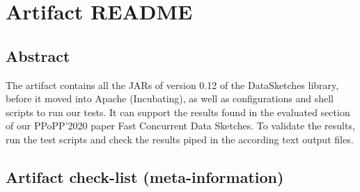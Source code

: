 \documentclass[onecolumn]{sigplanconf}
\begin{document}


\section{Artifact README}

\subsection{Abstract}



The artifact contains all the JARs of version 0.12 of the DataSketches
library, before it moved into Apache (Incubating), as well as configurations
and shell scripts to run our tests. It can support the results found in
the evaluated section of our PPoPP'2020 paper Fast Concurrent Data Sketches. To
validate the results, run the test scripts and check the results piped
in the according text output files.

\subsection{Artifact check-list (meta-information)}
\end{document}

